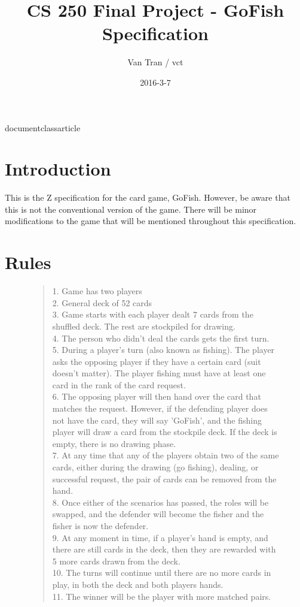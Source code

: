 documentclass{article}
\usepackage{bigpage}
\usepackage{blockpar}
\usepackage{blocktitle}
\usepackage{czt}

\title{CS 250 Final Project - GoFish Specification}
\author{Van Tran / vct}
\date{2016-3-7}


\maketitle

\section*{Introduction}
This is the Z specification for the card game, GoFish.
However, be aware that this is not the conventional version
of the game. There will be minor modifications to the game
that will be mentioned throughout this specification.

\section*{Rules}
\begin{figure}[h]
\begin{quotation}
1. Game has two players \\
2. General deck of 52 cards \\
3. Game starts with each player dealt 7 cards from the
shuffled deck. The rest are stockpiled for drawing. \\
4. The person who didn't deal the cards gets the first turn. \\
5. During a player's turn (also known as fishing). The player
asks the opposing player if they have a certain card (suit doesn't matter).
The player fishing must have at least one card in the rank of the card request. \\
6. The opposing player will then hand over the card that matches
the request. However, if the defending player does not have the card,
they will say 'GoFish', and the fishing player will draw a card
from the stockpile deck. If the deck is empty, there is no drawing phase. \\
7. At any time that any of the players obtain two of the same cards,
either during the drawing (go fishing), dealing, or successful request,
the pair of cards can be removed from the hand. \\
8. Once either of the scenarios has passed, the roles will be swapped,
and the defender will become the fisher and the fisher is now the defender. \\
9. At any moment in time, if a player's hand is empty, and there are still
cards in the deck, then they are rewarded with 5 more cards drawn from the deck. \\
10. The turns will continue until there are no more cards in play, in both
the deck and both players hands. \\
11. The winner will be the player with more matched pairs. \\
\end{quotation}
\end{figure}

